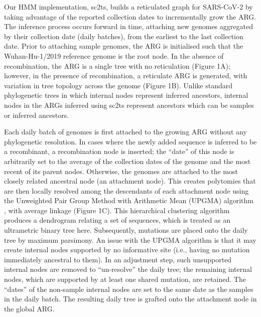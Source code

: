 \documentclass{article}
\begin{document}
Our HMM implementation, sc2ts, builds a reticulated graph for SARS-CoV-2 by
taking advantage of the reported collection dates to incrementally grow the
ARG. The inference process occurs forward in time, attaching new genomes
aggregated by their collection date (daily batches), from the earliest to the
last collection date. Prior to attaching sample genomes, the ARG is initialised
such that the Wuhan-Hu-1/2019 reference genome is the root node. In the absence
of recombination, the ARG is a single tree with no reticulation (Figure 1A);
however, in the presence of recombination, a reticulate ARG is generated, with
variation in tree topology across the genome (Figure 1B). Unlike standard
phylogenetic trees in which internal nodes represent inferred ancestors,
internal nodes in the ARGs inferred using sc2ts represent ancestors which can
be samples or inferred ancestors.

Each daily batch of genomes is first attached to the growing ARG without any
phylogenetic resolution. In cases where the newly added sequence is inferred to
be a recombinant, a recombination node is inserted; the “date” of this node is
arbitrarily set to the average of the collection dates of the genome and the
most recent of its parent nodes. Otherwise, the genomes are attached to the
most closely related ancestral node (an attachment node). This creates
polytomies that are then locally resolved among the descendants of each
attachment node using the Unweighted Pair Group Method with Arithmetic Mean
(UPGMA) algorithm \cite{Michener1957-tr}, with average linkage (Figure 1C).
This hierarchical clustering algorithm produces a dendrogram relating a set of
sequences, which is treated as an ultrametric binary tree here. Subsequently,
mutations are placed onto the daily tree by maximum parsimony. An issue with
the UPGMA algorithm is that it may create internal nodes supported by no
informative site (i.e., having no mutation immediately ancestral to them). In
an adjustment step, such unsupported internal nodes are removed to “un-resolve”
the daily tree; the remaining internal nodes, which are supported by at least
one shared mutation, are retained. The “dates” of the non-sample internal nodes
are set to the same date as the samples in the daily batch. The resulting daily
tree is grafted onto the attachment node in the global ARG.
\end{document}

